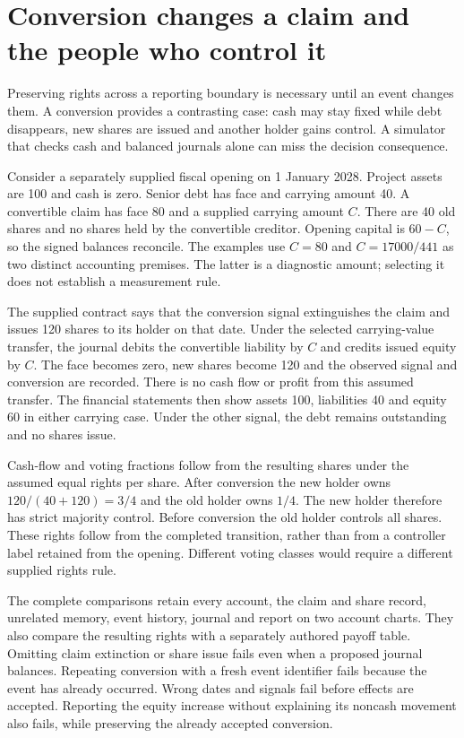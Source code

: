 
\section{Conversion changes a claim and the people who control it}
\label{sim:conversion-book-rights}
Preserving rights across a reporting boundary is necessary until an event
changes them. A conversion provides a contrasting case: cash may stay fixed
while debt disappears, new shares are issued and another holder gains
control. A simulator that checks cash and balanced journals alone can miss
the decision consequence.

Consider a separately supplied fiscal opening on 1 January 2028. Project
assets are 100 and cash is zero. Senior debt has face and carrying amount
40. A convertible claim has face 80 and a supplied carrying amount $C$.
There are 40 old shares and no shares held by the convertible creditor.
Opening capital is $60-C$, so the signed balances reconcile. The examples
use $C=80$ and $C=17000/441$ as two distinct accounting premises. The latter
is a diagnostic amount; selecting it does not establish a measurement rule.

The supplied contract says that the conversion signal extinguishes the
claim and issues 120 shares to its holder on that date. Under the selected
carrying-value transfer, the journal debits the convertible liability by
$C$ and credits issued equity by $C$. The face becomes zero, new shares
become 120 and the observed signal and conversion are recorded. There is
no cash flow or profit from this assumed transfer. The financial statements
then show assets 100, liabilities 40 and equity 60 in either carrying case.
Under the other signal, the debt remains outstanding and no shares issue.

Cash-flow and voting fractions follow from the resulting shares under the
assumed equal rights per share. After conversion the new holder owns
$120/(40+120)=3/4$ and the old holder owns $1/4$. The new holder therefore
has strict majority control. Before conversion the old holder controls all
shares. These rights follow from the completed transition, rather than
from a controller label retained from the opening. Different voting classes
would require a different supplied rights rule.

The complete comparisons retain every account, the claim and share record,
unrelated memory, event history, journal and report on two account charts.
They also compare the resulting rights with a separately authored payoff
table. Omitting claim extinction or share issue fails even when a proposed
journal balances. Repeating conversion with a fresh event identifier fails
because the event has already occurred. Wrong dates and signals fail before
effects are accepted. Reporting the equity increase without explaining its
noncash movement also fails, while preserving the already accepted conversion.

